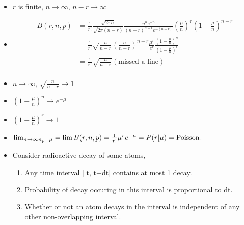 \begin{itemize}
    \item $r$ is finite, $n \rightarrow \infty$, $n-r \rightarrow \infty$

    \item \begin{align*}
              B(r,n,p) & = \frac{1}{r!} \frac{\sqrt{2 \pi n}}{\sqrt{2 \pi (n-r)}} \frac{n^n e^{-n}}{(n-r)^{n-r} e^{-(n-r)}} \left(\frac{\mu}{n}\right)^r \left(1-\frac{\mu}{n}\right)^{n-r} \\
                       & = \frac{1}{r!} \sqrt{\frac{n}{n-r}} \left( \frac{n}{n-r} \right)^{n-r} \frac{\mu^r}{e^r} \frac{(1-\frac{\mu}{n})^{n}}{(1-\frac{\mu}{n})^r}                         \\
                       & = \frac{1}{r!} \sqrt{\frac{n}{n-r}} \left(\text{missed a line} \right)                                                                                             \\
          \end{align*}

    \item $n\rightarrow \infty$, $\sqrt{\frac{n}{n-r}} \rightarrow 1$
    \item $\left(1-\frac{\mu}{n}\right)^n \rightarrow e^{-\mu}$
    \item $\left(1-\frac{\mu}{n}\right)^r \rightarrow 1$
    \item $\lim_{n\rightarrow \infty \\ n_p = \mu} = \lim B(r,n,p) = \frac{1}{r!} \mu^r e^{-\mu} = P(r|\mu) = \text{Poisson}$.
    \item Consider radioactive decay of some atoms,
          \begin{enumerate}
              \item Any time interval [ t, t+dt] contains at most 1 decay.
              \item Probability of decay occuring in this interval is proportional to dt.
              \item Whether or not an atom decays in the interval is independent of any other non-overlapping interval.
          \end{enumerate}


\end{itemize}
